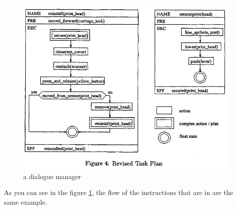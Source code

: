 \begin{figure}[H]
    \centering
    \includegraphics[width=\textwidth]{images/instructional_DM_taskplan.PNG}
    \caption{a dialogue manager}
    \label{fig:instruct-DM}
\end{figure}

As you can see in the figure \ref{fig:instruct-DM}, the 
flow of the instructions that are in \pageref{fig:instruct-DM} are the same example.